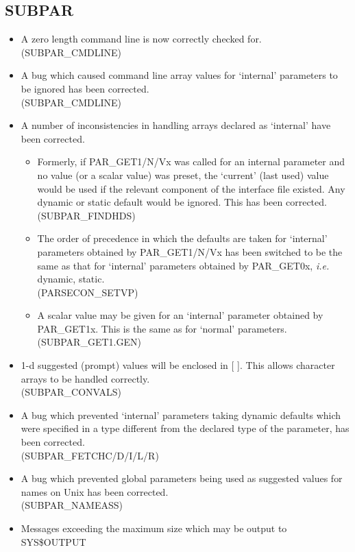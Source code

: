 \subsection{SUBPAR}
\begin{itemize}
\item A zero length command line is now correctly checked for.\\
(SUBPAR\_CMDLINE)
\item A bug which caused command line array values for `internal' parameters
to be ignored has been corrected.\\
(SUBPAR\_CMDLINE)
\item A number of inconsistencies in handling arrays declared as `internal'
have been corrected.
\begin{itemize}
\item Formerly, if PAR\_GET1/N/Vx was called for an internal parameter and no
value (or a scalar value) was preset, the `current' (last used) value would be
used if the relevant component of the interface file existed. Any dynamic or
static default would be ignored. This has been corrected.\\
(SUBPAR\_FINDHDS)
\item The order of precedence in which the defaults are taken for `internal'
parameters obtained by PAR\_GET1/N/Vx has been switched to be the same as that
for `internal' parameters obtained by PAR\_GET0x, {\em i.e.} dynamic, static.\\
(PARSECON\_SETVP)
\item A scalar value may be given for an `internal' parameter obtained by
PAR\_GET1x. This is the same as for `normal' parameters.\\
(SUBPAR\_GET1.GEN)
\end{itemize}
\item 1-d suggested (prompt) values will be enclosed in [ ]. This allows
character arrays to be handled correctly.\\
(SUBPAR\_CONVALS)
\item A bug which prevented `internal' parameters taking dynamic defaults which
were specified in a type different from the declared type of the parameter, has
been corrected.\\
(SUBPAR\_FETCHC/D/I/L/R)
\item A bug which prevented global parameters being used as suggested values
for names on Unix has been corrected.\\
(SUBPAR\_NAMEASS)
\item Messages exceeding the maximum size which may be output to SYS\$OUTPUT

\end{itemize}
